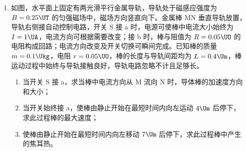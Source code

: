 \documentclass[\gkver]{gaokaozhenti}
\begin{document}
\begin{enumerate}
{	$mg\sin 30^\circ = \mu mg\cos 30^\circ$

	得 $\mu = \frac{\sqrt{3}}{3}$

	（2）（3）A 从高为 $h$ 的地方滑下后速度为 $v_{0}$，根据动能定理有

	$3mgh - \mu \cdot 3mg\cos 60^\circ \frac{h}{\sin 60^\circ} = \frac{1}{2} \cdot 3mv_{0}^{2}$

	A 与 B 碰撞后速度分别为 $v_{1}$ 和 $v_{2}$，根据动量守恒、能量守恒有

	$3mv_{0} = 3mv_{1} + mv_{2}$

	$\frac{1}{2} \cdot 3mv_{0}^{2} = \frac{1}{2} \cdot 3mv_{1}^{2} + \frac{1}{2}mv_{2}^{2}$

	B 到达最高点速度为 $v_{3}$，根据牛顿第二定律有

	$mg = m\frac{v_{3}^{2}}{L}$

	根据能量守恒有 $\frac{1}{2}mv_{2}^{2} = \frac{1}{2}mv_{3}^{2} + mg \cdot 2L$

	解得 $v_{2} = \sqrt{3gh}$，$L = 0.6h$。
}

\item
如图，水平面上固定有两光滑平行金属导轨，导轨处于磁感应强度为 $B = 0.25 \UT$ 的匀强磁场中，磁场方向竖直向下。金属棒 MN 垂直导轨放置，导轨右侧接自动控制电路，开关 S 接 a 时，电源可使棒中电流大小始终为 $I = 1 \UA$，电流方向可根据需要改变；接 b 时，棒与阻值为 $R = 0.05 \UO$ 的电阻构成回路；电流方向改变及开关切换可瞬间完成。已知棒的质量 $m = 0.1 \Ukg$，电阻 $r = 0.05 \UO$，棒的长度与导轨间距均为 $L = 0.4 \Um$，棒运动过程中始终与导轨接触良好，导轨电路忽略不计且足够长。

\begin{enumerate}
	\item
	当开关 S 接 a，求当棒中电流方向从 M 流向 N 时，导体棒的加速度方向和大小；
	\item
	当开关始终接 a，使棒由静止开始在最短时间内向左运动 $4 \Um$ 后停下，求此过程棒的最大速度；
	\item
	使棒由静止开始在最短时间内向左移动 $7 \Um$ 后停下，求此过程棒中产生的焦耳热。
\end{enumerate}


\end{enumerate}
\end{document}
